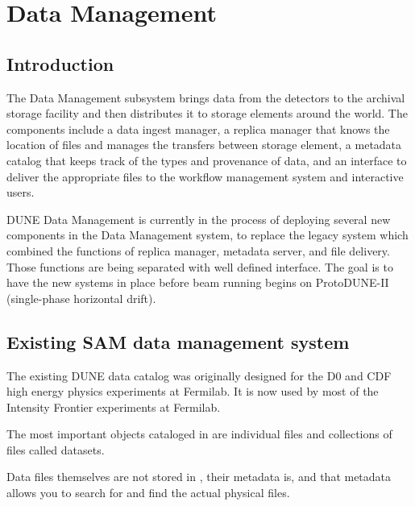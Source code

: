 \documentclass[../main-v1.tex]{subfiles}
\begin{document}
\chapter{Data Management  }
\label{ch:datamgmt}

\section{Introduction }
\label{sec:datamgmt:xyz}  %

The Data Management subsystem brings data from the detectors to the archival storage facility 
and then distributes it to storage elements around the world.  The components include a data ingest manager, a
replica manager that knows the location of files and manages the transfers between storage element, a metadata 
catalog that keeps track of the types and provenance of data, and an interface to deliver the appropriate files 
to the workflow management system and interactive users.

DUNE Data Management is currently in the process of deploying several new components in the Data Management
system, to replace the legacy \cite{Illingworth:2014mba} system which combined the functions of replica manager, metadata server, 
and file delivery.  Those functions are being separated with well defined   interface.  The goal is to have the new systems in place before beam running begins on ProtoDUNE-II
(single-phase horizontal drift).  


\label{ch:sam:catalog}

\section{Existing SAM data management system}

The existing DUNE data catalog  was originally designed for the D0 and CDF high energy physics experiments at Fermilab.  It is now used by most of the Intensity Frontier experiments at Fermilab. 

The most important objects cataloged in  are individual files and collections of files called
datasets.

Data files themselves are not stored in , their metadata is, and that metadata allows you to search for and find the actual physical files.
\end{document}
